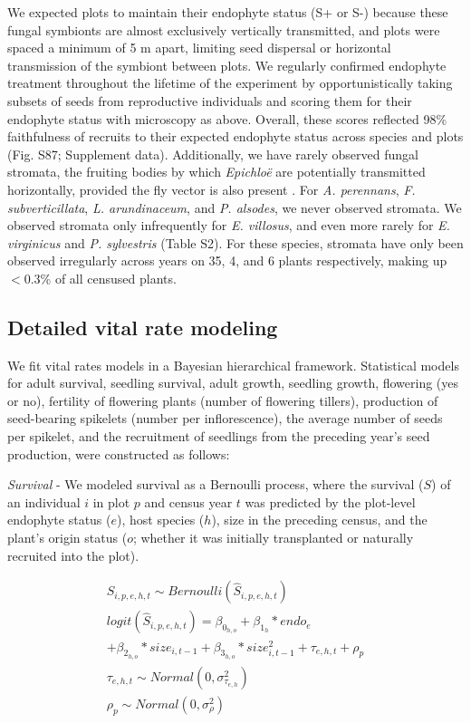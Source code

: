 \documentclass[lineno, sn-basic]{sn-jnl}%
\begin{document}
We expected plots to maintain their endophyte status (S+ or S-) because these fungal symbionts are almost exclusively vertically transmitted, and plots were spaced a minimum of 5 m apart, limiting seed dispersal or horizontal transmission of the symbiont between plots. 
We regularly confirmed endophyte treatment throughout the lifetime of the experiment by opportunistically taking subsets of seeds from reproductive individuals and scoring them for their endophyte status with microscopy as above.
Overall, these scores reflected 98\% faithfulness of recruits to their expected endophyte status across species and plots (Fig. S87; Supplement data). 
Additionally, we have rarely observed fungal stromata, the fruiting bodies by which \emph{Epichlo\"e} are potentially transmitted horizontally, provided the fly vector is also present \citep{bultman1995mutualistic}. 
For \emph{A. perennans}, \emph{F. subverticillata}, \emph{L. arundinaceum}, and \emph{P. alsodes}, we never observed stromata. 
We observed stromata only infrequently for \emph{E. villosus}, and even more rarely for \emph{E. virginicus} and \emph{P. sylvestris} (Table S2). 
For these species, stromata have only been observed irregularly across years on 35, 4, and 6 plants respectively, making up $< 0.3$\% of all censused plants.

\subsection{Detailed vital rate modeling}\label{SupMethods2}

We fit vital rates models in a Bayesian hierarchical framework. 
Statistical models for adult survival, seedling survival, adult growth, seedling growth, flowering (yes or no), fertility of flowering plants (number of flowering tillers), production of seed-bearing spikelets (number per inflorescence), the average number of seeds per spikelet, and the recruitment of seedlings from the preceding year's seed production, were constructed as follows:

\emph{Survival} - We modeled survival as a Bernoulli process, where the survival ($S$) of an individual $i$ in plot $p$ and census year $t$ was predicted by the plot-level endophyte status ($e$), host species ($h$), size in the preceding census, and the plant's origin status ($o$; whether it was initially transplanted or naturally recruited into the plot).

\begin{subequations}
	\label{eq:survival}
	\begin{align}
		S_{i,p,e,h,t} \sim Bernoulli(\hat{S}_{i,p,e,h,t})\\
		logit(\hat{S}_{i,p,e,h,t}) = \beta_{0_{h,o}} + \beta_{1_{h}}*endo_{e}\\
		+ \beta_{2_{h,o}}*size_{i,t-1} +\beta_{3_{h,o}}*size^2_{i,t-1} + \tau_{e,h,t} + \rho_{p}\\
		\tau_{e,h,t} \sim Normal(0,\sigma^2_{\tau_{e,h}})\\
		\rho_{p} \sim Normal(0,\sigma^2_{\rho})
	\end{align}
\end{subequations}
\end{document}
